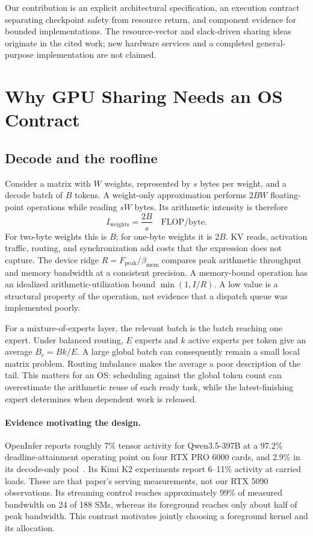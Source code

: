 Our contribution is an explicit architectural specification, an execution
contract separating checkpoint safety from resource return, and component
evidence for bounded implementations. The resource-vector and slack-driven
sharing ideas originate in the cited work; new hardware services and a
completed general-purpose implementation are not claimed.

\section{Why GPU Sharing Needs an OS Contract}
\label{sec:motivation}
\subsection{Decode and the roofline}
Consider a matrix with $W$ weights, represented by $s$ bytes per weight, and
a decode batch of $B$ tokens. A weight-only approximation performs $2BW$
floating-point operations while reading $sW$ bytes. Its arithmetic intensity
is therefore
\begin{equation}
 I_{\mathrm{weights}} = \frac{2B}{s}\quad\text{FLOP/byte}.
\end{equation}
For two-byte weights this is $B$; for one-byte weights it is $2B$. KV reads,
activation traffic, routing, and synchronization add costs that the expression
does not capture. The device ridge $R=F_{\mathrm{peak}}/\beta_{\mathrm{mem}}$
compares peak arithmetic throughput and memory bandwidth at a consistent
precision. A memory-bound operation has an idealized arithmetic-utilization
bound $\min(1,I/R)$. A low value is a structural property of the operation,
not evidence that a dispatch queue was implemented poorly.

For a mixture-of-experts layer, the relevant batch is the batch reaching one
expert. Under balanced routing, $E$ experts and $k$ active experts per token
give an average $B_e=Bk/E$. A large global batch can consequently remain a
small local matrix problem. Routing imbalance makes the average a poor
description of the tail. This matters for an OS: scheduling against the
global token count can overestimate the arithmetic reuse of each ready task,
while the latest-finishing expert determines when dependent work is released.

\paragraph{Evidence motivating the design.}
OpenInfer reports roughly 7\% tensor activity for Qwen3.5-397B at a
97.2\% deadline-attainment operating point on four RTX PRO 6000 cards,
and 2.9\% in its decode-only pool~\cite{Nourai2026GPUOS}. Its Kimi K2
experiments report 6--11\% activity at carried loads. These are that paper's
serving measurements, not our RTX 5090 observations. Its streaming control
reaches approximately 99\% of measured bandwidth on 24 of 188 SMs, whereas
its foreground reaches only about half of peak bandwidth. This contrast
motivates jointly choosing a foreground kernel and its allocation.

